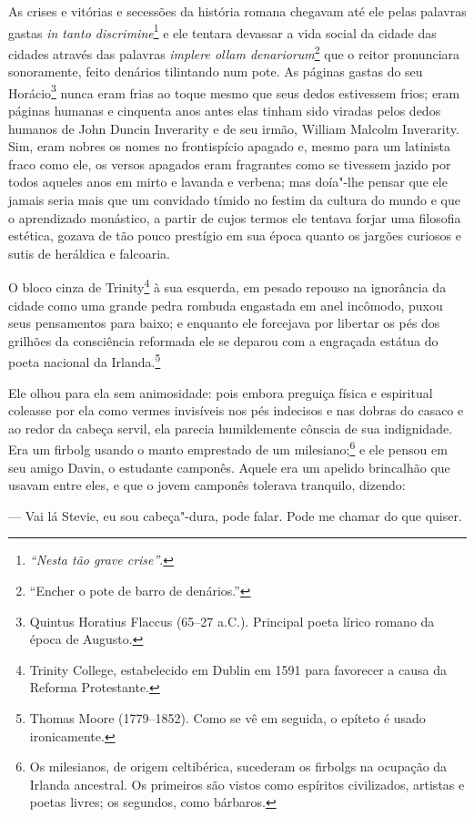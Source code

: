 As crises e vitórias e secessões da história romana chegavam até ele pelas
palavras gastas \textit{in tanto discrimine}\footnote{ \textit{“Nesta tão grave
crise”}.} e ele tentara devassar a vida social da cidade das cidades através das
palavras \textit{implere ollam denariorum}\footnote{ “Encher o pote de barro de
denários.”} que o reitor pronunciara sonoramente, feito denários tilintando num
pote. As páginas gastas do seu Horácio\footnote{ Quintus Horatius Flaccus
(65--27 a.C.). Principal poeta lírico romano da época de Augusto.} nunca eram
frias ao toque mesmo que seus dedos estivessem frios; eram páginas humanas e
cinquenta anos antes elas tinham sido viradas pelos dedos humanos de John Duncin
Inverarity e de seu irmão, William Malcolm Inverarity. Sim, eram nobres os nomes
no frontispício apagado e, mesmo para um latinista fraco como ele, os versos
apagados eram fragrantes como se tivessem jazido por todos aqueles anos em mirto
e lavanda e verbena; mas doía"-lhe pensar que ele jamais seria mais que um
convidado tímido no festim da cultura do mundo e que o aprendizado monástico, a
partir de cujos termos ele tentava forjar uma filosofia estética, gozava de tão
pouco prestígio em sua época quanto os jargões curiosos e sutis de heráldica e
falcoaria.

O bloco cinza de Trinity\footnote{ Trinity College, estabelecido em
Dublin em 1591 para favorecer a causa da Reforma Protestante.} à sua
esquerda, em pesado repouso na ignorância da cidade como uma grande
pedra rombuda engastada em anel incômodo, puxou seus pensamentos para
baixo; e enquanto ele forcejava por libertar os pés dos grilhões da
consciência reformada ele se deparou com a engraçada estátua do poeta
nacional da Irlanda.\footnote{ Thomas Moore (1779--1852). Como se vê em
seguida, o epíteto é usado ironicamente.}

Ele olhou para ela sem animosidade: pois embora preguiça física e
espiritual coleasse por ela como vermes invisíveis nos pés indecisos e
nas dobras do casaco e ao redor da cabeça servil, ela parecia
humildemente cônscia de sua indignidade. Era um firbolg usando o manto
emprestado de um milesiano;\footnote{ Os milesianos, de origem
celtibérica, sucederam os firbolgs na ocupação da Irlanda ancestral. Os
primeiros são vistos como espíritos civilizados, artistas e poetas
livres; os segundos, como bárbaros.} e ele pensou em seu amigo Davin,
o estudante camponês. Aquele era um apelido brincalhão que usavam entre
eles, e que o jovem camponês tolerava tranquilo, dizendo:

 --- Vai lá Stevie, eu sou cabeça"-dura, pode falar. Pode me chamar do que
quiser.

